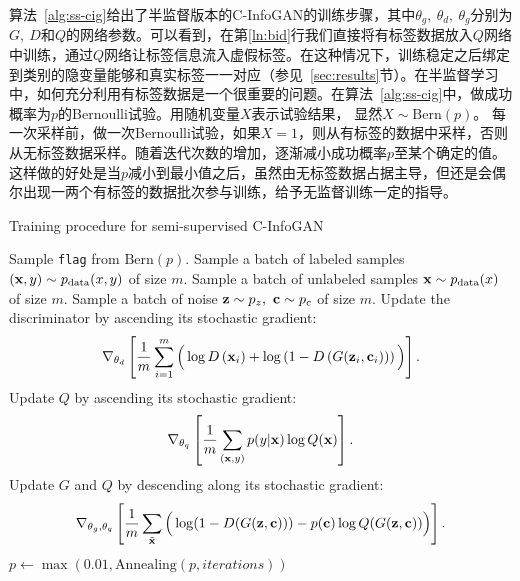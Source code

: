 算法~\ref{alg:ss-cig}给出了半监督版本的C-InfoGAN的训练步骤，其中$\theta_g, ~\theta_d, ~\theta_g$分别为$G, ~D$和$Q$的网络参数。可以看到，在第\ref{ln:bid}行我们直接将有标签数据放入$Q$网络中训练，通过$Q$网络让标签信息流入虚假标签。在这种情况下，训练稳定之后绑定到类别的隐变量能够和真实标签一一对应（参见~\ref{sec:results}节）。在半监督学习中，如何充分利用有标签数据是一个很重要的问题。在算法~\ref{alg:ss-cig}中，做成功概率为$p$的Bernoulli试验。用随机变量$X$表示试验结果，
显然$X\sim\text{Bern}(p)$。
每一次采样前，做一次Bernoulli试验，如果$X=1$，则从有标签的数据中采样，否则从无标签数据采样。随着迭代次数的增加，逐渐减小成功概率$p$至某个确定的值。这样做的好处是当$p$减小到最小值之后，虽然由无标签数据占据主导，但还是会偶尔出现一两个有标签的数据批次参与训练，给予无监督训练一定的指导。
\begin{algorithm}[htbp]
  \small
  \caption{Training procedure for semi-supervised C-InfoGAN}
  \label{alg:ss-cig}
  \begin{algorithmic}[1]
      \State Sample \texttt{flag} from $\text{Bern}(p)$.
        \State Sample a batch of labeled samples 
               $(\mathbf{x}, y) \sim p_{\text{data}}(x,y)$ of size $m$.
      \Else
        \State Sample a batch of unlabeled samples $\mathbf{x} \sim p_{\text{data}}(x)$ of
        size $m$.
      \EndIf
      \State Sample a batch of noise $\mathbf{z}\sim p_z, ~\mathbf{c}\sim p_c$ of size
      $m$.
      \State Update the discriminator by ascending its stochastic gradient:
      \[
        \nabla_{\theta_d} \left[ 
          \frac{1}{m} \sum_{i=1}^m \Big( 
            \log D\left(\mathbf{x}_i\right) + 
            \log\left( 1 - D\left( G(\mathbf{z}_i, \mathbf{c}_i) \right) \right)
          \Big)
        \right].
      \]
        \State Update $Q$ by ascending its stochastic gradient: \label{ln:bid}
        \[
          \nabla_{\theta_q} \left[ 
            \frac{1}{m} \sum_{(\mathbf{x}, y)} p(y|\mathbf{x}) \log Q(\bf{x}) 
          \right].
        \]
      \EndIf
      \State Update $G$ and $Q$ by descending along its stochastic gradient:
      \[
        \nabla_{\theta_g,\theta_q} \left[ 
          \frac{1}{m} \sum_{\tilde{\mathbf{x}}} \Big(
            \log(1 - D(G(\mathbf{z},\mathbf{c}))) -
            p(\mathbf{c})\log Q(G(\mathbf{z}, \mathbf{c}))
          \Big)
        \right]. \label{ln:test}
      \]
      \State $p \gets \max(0.01, \text{Annealing}(p, iterations))$ 
    \EndFor
  \end{algorithmic}
\end{algorithm}

